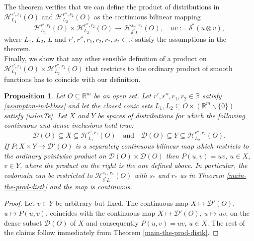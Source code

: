 \documentclass{amsart}
\newtheorem{proposition}[theorem]{Proposition}
\theoremstyle{definition}
\begin{document}
The theorem verifies that we can define the product of distributions in $\mathscr{H}_{L_1} ^{r',r_1} (O)$ and $\mathscr{H}_{L_2} ^{r'',r_2} (O)$ as the continuous bilinear mapping
\begin{equation}\label{map-cont-pulba-mult11}
\mathscr{H}_{L_1} ^{r',r_1} (O)\times\mathscr{H}_{L_2} ^{r'',r_2} (O)\rightarrow \mathscr{H}_{\delta^* L} ^{s_*, \, r_*} (O),\quad uv:= \delta^*(u \otimes v),
\end{equation}
where $L_1$, $L_2$, $L$ and $r', r'',r_1,r_2, r_*,s_*\in \mathbb{R}$ satisfy the assumptions in the theorem.\\
\indent Finally, we show that any other sensible definition of a product on $\mathscr{H}_{L_1} ^{r',r_1} (O)\times\mathscr{H}_{L_2} ^{r'',r_2} (O)$ that restricts to the ordinary product of smooth functions has to coincide with our definition.

\begin{proposition}\label{ext-mulgbsk}
Let $O\subseteq \mathbb{R}^m$ be an open set. Let $r', r'',r_1,r_2\in \mathbb{R}$ satisfy \eqref{asumpton-ind-klsss} and let the closed conic sets $L_1,L_2\subseteq O\times(\mathbb{R}^m\backslash\{0\})$ satisfy \eqref{uslovTe}. Let $X$ and $Y$ be spaces of distributions for which the following continuous and dense inclusions hold true:
\begin{equation*}
\mathcal{D}(O)\subseteq X\subseteq \mathscr{H}_{L_1} ^{r',r_1} (O)\quad \mbox{and}\quad \mathcal{D}(O)\subseteq Y\subseteq \mathscr{H}_{L_2} ^{r'',r_2} (O).
\end{equation*}
If $P:X\times Y\rightarrow \mathcal{D}'(O)$ is a separately continuous bilinear map which restricts to the ordinary pointwise product on $\mathcal{D}(O)\times\mathcal{D}(O)$ then $P(u,v)=uv$, $u\in X$, $v\in Y$, where the product on the right is the one defined above. In particular, the codomain can be restricted to $\mathscr{H}_{\delta^* L} ^{s_*, \, r_*} (O)$ with $s_*$ and $r_*$ as in Theorem \ref{main-the-prod-distk} and the map is continuous.
\end{proposition}

\begin{proof}
Let $v\in Y$ be arbitrary but fixed. The continuous map $X\mapsto \mathcal{D}'(O)$, $u\mapsto P(u,v)$, coincides with the continuous map $X\mapsto \mathcal{D}'(O)$, $u\mapsto uv$, on the dense subset $\mathcal{D}(O)$ of $X$ and consequently $P(u,v)=uv$, $u\in X$. The rest of the claims follow immediately from Theorem \ref{main-the-prod-distk}.
\end{proof}
\end{document}
